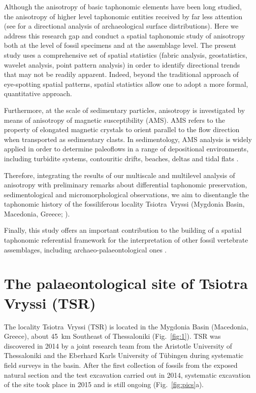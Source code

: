 \documentclass[review,times,authoryear]{elsarticle} %
\begin{document}
Although the anisotropy of basic taphonomic elements have been long studied, the anisotropy of higher level taphonomic entities received by far less attention (see \citealp{Markofsky2012} for a directional analysis of archaeological surface distributions). Here we address this research gap and conduct a spatial taphonomic study of anisotropy both at the level of fossil specimens and at the assemblage level. The present study uses a comprehensive set of spatial statistics (fabric analysis, geostatistics, wavelet analysis, point pattern analysis) in order to identify directional trends that may not be readily apparent. Indeed, beyond the traditional approach of eye-spotting spatial patterns, spatial statistics allow one to adopt a more formal, quantitative approach.

Furthermore, at the scale of sedimentary particles, anisotropy is investigated by means of anisotropy of magnetic susceptibility (AMS). AMS refers to the property of elongated magnetic crystals to orient parallel to the flow direction when transported as sedimentary clasts. In sedimentology, AMS analysis is widely applied in order to determine paleoflows in a range of depositional environments, including turbidite systems, contouritic drifts, beaches, deltas and tidal flats \citep[][among others]{Lowrie1987,Liu2001,Pares2007,Novak2014,Felletti2016}.

Therefore, integrating the results of our multiscale and multilevel analysis of anisotropy with preliminary remarks about differential taphonomic preservation, sedimentological and micromorphological observations, we aim to disentangle the taphonomic history of the fossiliferous locality Tsiotra~Vryssi (Mygdonia Basin, Macedonia, Greece; \citealp{Konidaris2015}).

Finally, this study offers an important contribution to the building of a spatial taphonomic referential framework for the interpretation of other fossil vertebrate assemblages, including archaeo-palaeontological ones \citep{Dominguez-Rodrigo2017}.

\section{The palaeontological site of Tsiotra Vryssi (TSR)}

The locality Tsiotra~Vryssi (TSR) is located in the Mygdonia Basin (Macedonia, Greece), about 45~km Southeast of Thessaloniki (Fig.~\ref{fig:1}). TSR was discovered in 2014 by a joint research team from the Aristotle University of Thessaloniki and the Eberhard Karls University of Tübingen during systematic field surveys in the basin. After the first collection of fossils from the exposed natural section and the test excavation carried out in 2014, systematic excavation of the site took place in 2015 and is still ongoing (Fig.~\ref{fig:pics}a).
\end{document}
